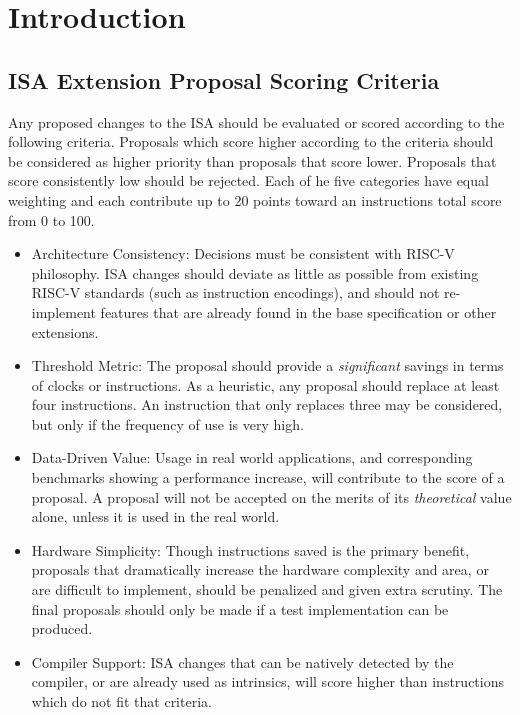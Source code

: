 \chapter{Introduction}\label{introduction}

\section{ISA Extension Proposal Scoring
Criteria}\label{isa-extension-proposal-scoring-criteria}

Any proposed changes to the ISA should be evaluated or scored according
to the following criteria. Proposals which score higher according to the
criteria should be considered as higher priority than proposals that
score lower. Proposals that score consistently low should be rejected.
Each of he five categories have equal weighting and each contribute up
to 20 points toward an instructions total score from 0 to 100.

\begin{itemize}
\item
  Architecture Consistency: Decisions must be consistent with RISC-V
  philosophy. ISA changes should deviate as little as possible from
  existing RISC-V standards (such as instruction encodings), and should
  not re-implement features that are already found in the base
  specification or other extensions.
\item
  Threshold Metric: The proposal should provide a \emph{significant}
  savings in terms of clocks or instructions. As a heuristic, any
  proposal should replace at least four instructions. An instruction
  that only replaces three may be considered, but only if the frequency
  of use is very high.
\item
  Data-Driven Value: Usage in real world applications, and corresponding
  benchmarks showing a performance increase, will contribute to the
  score of a proposal. A proposal will not be accepted on the merits of
  its \emph{theoretical} value alone, unless it is used in the real
  world.
\item
  Hardware Simplicity: Though instructions saved is the primary benefit,
  proposals that dramatically increase the hardware complexity and area,
  or are difficult to implement, should be penalized and given extra
  scrutiny. The final proposals should only be made if a test
  implementation can be produced.
\item
  Compiler Support: ISA changes that can be natively detected by the
  compiler, or are already used as intrinsics, will score higher than
  instructions which do not fit that criteria.
\end{itemize}

